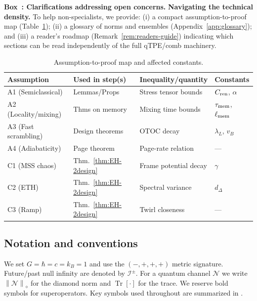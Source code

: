 \documentclass[11pt,a4paper]{article}
\newcommand{\normD}[1]{\left\lVert #1 \right\rVert_{\diamond}}
\newcommand{\Ddiamond}[1]{\normD{#1}}
\newcounter{boxedresult}
\newenvironment{boxedresult}[1]{\refstepcounter{boxedresult}\begin{infobox}\noindent\textbf{Box~\theboxedresult: #1.}}{\end{infobox}}
\newcommand{\Tr}{\operatorname{Tr}}
\theoremstyle{plain}
\theoremstyle{definition}
\theoremstyle{remark}
\begin{document}
\begin{boxedresult}{Clarifications addressing open concerns}
\medskip
\noindent\textbf{Navigating the technical density.}
To help non-specialists, we provide: (i) a compact assumption-to-proof map (Table~\ref{tab:assumption_map}); (ii) a glossary of norms and ensembles (Appendix~\ref{app:glossary}); and (iii) a reader's roadmap (Remark~\ref{rem:readers-guide}) indicating which sections can be read independently of the full qTPE/comb machinery.
\end{boxedresult}

\begin{table}[h!]
\centering
\caption{Assumption-to-proof map and affected constants.}
\label{tab:assumption_map}
\small
\begin{tabular*}{\textwidth}{@{\extracolsep{\fill}}llll@{}}
\toprule
\textbf{Assumption} & \textbf{Used in step(s)} & \textbf{Inequality/quantity} & \textbf{Constants} \\
\midrule
A1 (Semiclassical) & Lemmas/Props & Stress tensor bounds & $C_{\rm ren}$, $\alpha$ \\
A2 (Locality/mixing) & Thms on memory & Mixing time bounds & $\tau_{\rm mem}$, $\ell_{\rm mem}$ \\
A3 (Fast scrambling) & Design theorems & OTOC decay & $\lambda_L$, $v_B$ \\
A4 (Adiabaticity) & Page theorem & Page-rate relation & --- \\
C1 (MSS chaos) & Thm.~\ref{thm:EH-2design} & Frame potential decay & $\gamma$ \\
C2 (ETH) & Thm.~\ref{thm:EH-2design} & Spectral variance & $d_\Delta$ \\
C3 (Ramp) & Thm.~\ref{thm:EH-2design} & Twirl closeness & --- \\
\bottomrule
\end{tabular*}
\end{table}

\subsection{Notation and conventions}

\label{sec:notation}
We set $G=\hbar=c=k_B=1$ and use the $(-,+,+,+)$ metric signature. Future/past null infinity are denoted by $\mathscr{I}^\pm$. For a quantum channel $\mathcal{N}$ we write $\Ddiamond{\mathcal{N}}$ for the diamond norm and $\Tr[\cdot]$ for the trace. We reserve bold symbols for superoperators. Key symbols used throughout are summarized in .
\end{document}
